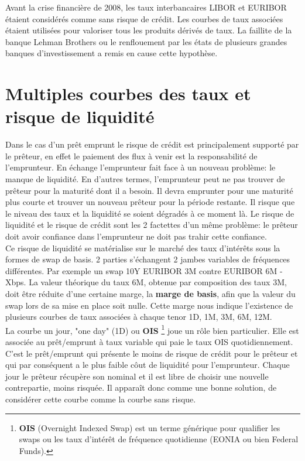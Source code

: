 \documentclass{article}
\begin{document}
Avant la crise financière de 2008, les taux interbancaires LIBOR et EURIBOR étaient considérés comme sans risque de crédit. Les courbes de taux associées étaient utilisées pour valoriser tous les produits dérivés de taux. La faillite de la banque Lehman Brothers ou le renflouement par les états de plusieurs grandes banques d'investissement a remis en cause cette hypothèse.\\

\section*{Multiples courbes des taux et risque de liquidité}

Dans le cas d’un prêt emprunt le risque de crédit est principalement supporté par le prêteur, en effet le paiement des flux à venir est la responsabilité de l’emprunteur. En échange l’emprunteur fait face à un nouveau problème: le manque de liquidité. En d’autres termes, l'emprunteur peut ne pas trouver de prêteur pour la maturité dont il a besoin. Il devra emprunter pour une maturité plus courte et trouver un nouveau prêteur pour la période restante. Il risque que le niveau des taux et la liquidité se soient dégradés à ce moment là. Le risque de liquidité et le risque de crédit sont les 2 factettes d’un même problème: le prêteur doit avoir confiance dans l’emprunteur ne doit pas trahir cette confiance.\\

Ce risque de liquidité se matérialise sur le marché des taux d’intérêts sous la formes de swap de basis. 2 parties s’échangent 2 jambes variables de fréquences différentes. Par exemple un swap 10Y EURIBOR 3M contre EURIBOR 6M - Xbps. La valeur théorique du taux 6M, obtenue par composition des taux 3M, doit être réduite d’une certaine marge, la \textbf{marge de basis}, afin que la valeur du swap lors de sa mise en place soit nulle. Cette marge nous indique l’existence de plusieurs courbes de taux associées à chaque tenor 1D, 1M, 3M, 6M, 12M.\\

La courbe un jour, "one day" (1D) ou \textbf{OIS} \footnote{\textbf{OIS} (Overnight Indexed Swap) est un terme générique pour qualifier les swaps ou les taux d'intérêt de fréquence quotidienne (EONIA ou bien Federal Funds).} joue un rôle bien particulier. Elle est associée au prêt/emprunt à taux variable qui paie le taux OIS quotidiennement. C’est le prêt/emprunt qui présente le moins de risque de crédit pour le prêteur et qui par conséquent a le plus faible côut de liquidité pour l’emprunteur. Chaque jour le prêteur récupère son nominal et il est libre de choisir une nouvelle contrepartie, moins risquée. Il apparaît donc comme une bonne solution, de considérer cette courbe comme la courbe sans risque.
\end{document}
